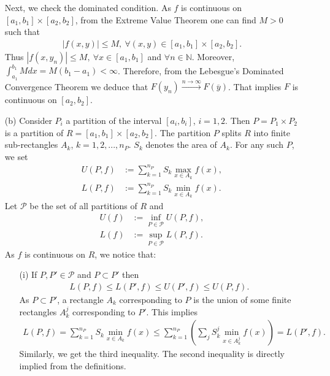 \begin{problem}
\begin{solution}
\begin{enumerate}
    Next, we check the dominated condition. As $f$ is continuous on $[a_1,b_1]\times [a_2,b_2]$, from the Extreme Value Theorem one can find $M>0$ such that
    \begin{align*}
        \left| f(x,y) \right| \le M,\ \forall (x,y) \in [a_1,b_1]\times [a_2,b_2].
    \end{align*}
    Thus $\left| f(x,y_n) \right| \le M,\ \forall x\in [a_1,b_1]$ and $\forall n\in\mathbb{N}$. Moreover, $\displaystyle\int_{a_1}^{b_1}Mdx = M(b_1-a_1) <\infty$. Therefore, from the Lebesgue's Dominated Convergence Theorem we deduce that $F(y_n) \xrightarrow{n\rightarrow\infty} F(\overline{y})$. That implies $F$ is continuous on $[a_2,b_2]$.
    \item[(b)] Consider $P_i$ a partition of the interval $[a_i,b_i]$, $i=1,2$. Then $P=P_1 \times P_2$ is a partition of $R=[a_1,b_1]\times [a_2,b_2]$. The partition $P$ splits $R$ into finite sub-rectangles $A_k$, $k=1,2,...,n_P$. $S_k$ denotes the area of $A_k$. For any such $P$, we set
    \begin{align*}
        U(P,f) &:= \displaystyle\sum\limits_{k=1}^{n_P} S_k \max\limits_{x\in A_k}f(x),\\
        L(P,f) &:= \displaystyle\sum\limits_{k=1}^{n_P} S_k \min\limits_{x\in A_k}f(x).
    \end{align*}
    Let $\mathcal{P}$ be the set of all partitions of $R$ and 
    \begin{align*}
        U(f) &:= \inf\limits_{P\in \mathcal{P}} U(P,f),\\
        L(f) &:= \sup\limits_{P\in \mathcal{P}} L(P,f).
    \end{align*}
    As $f$ is continuous on $R$, we notice that:
    \begin{enumerate}
        \item[(i)] If $P,P'\in\mathcal{P}$ and $P\subset P'$ then 
        \begin{align*}
            L(P,f) \le L(P',f) \le U(P',f) \le U(P,f).
        \end{align*}
        As $P\subset P'$, a rectangle $A_k$ corresponding to $P$ is the union of some finite rectangles $A^j_k$ corresponding to $P'$. This implies
        \begin{align*}
            L(P,f) = \displaystyle\sum\limits_{k=1}^{n_P} S_k \min\limits_{x\in A_k}f(x) \le \displaystyle\sum\limits_{k=1}^{n_P} \left( \displaystyle\sum\limits_{j} S^j_k \min\limits_{x\in A^j_k}f(x) \right) = L(P',f).
        \end{align*}
        Similarly, we get the third inequality. The second inequality is directly implied from the definitions. 

\end{enumerate}
\end{enumerate}
\end{solution}
\end{problem}
